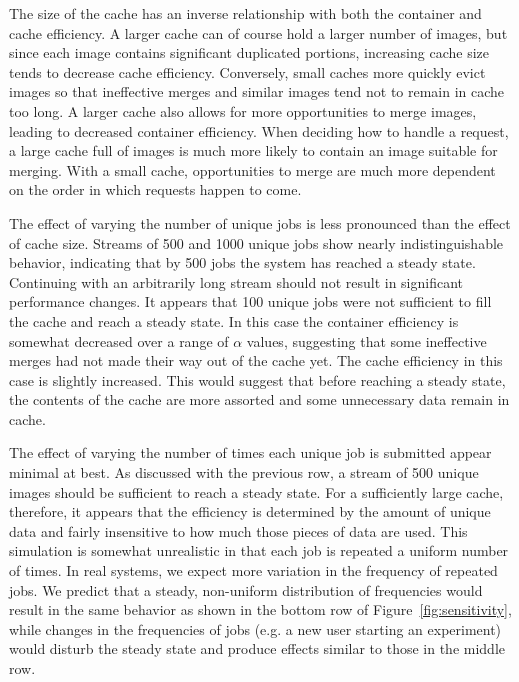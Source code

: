 \documentclass[sigconf]{acmart}
\begin{document}
The size of the cache has an inverse relationship with both the container and cache efficiency.
A larger cache can of course hold a larger number of images,
but since each image contains significant duplicated portions,
increasing cache size tends to decrease cache efficiency.
Conversely, small caches more quickly evict images so that ineffective merges and similar images tend not to remain in cache too long.
A larger cache also allows for more opportunities to merge images,
leading to decreased container efficiency.
When deciding how to handle a request,
a large cache full of images is much more likely to contain an image suitable for merging.
With a small cache, opportunities to merge are much more dependent on the order in which requests happen to come.

The effect of varying the number of unique jobs is less pronounced than the effect of cache size.
Streams of 500 and 1000 unique jobs show nearly indistinguishable behavior,
indicating that by 500 jobs the system has reached a steady state.
Continuing with an arbitrarily long stream should not result in significant performance changes.
It appears that 100 unique jobs were not sufficient to fill the cache and reach a steady state.
In this case the container efficiency is somewhat decreased over a range of $\alpha$ values,
suggesting that some ineffective merges had not made their way out of the cache yet.
The cache efficiency in this case is slightly increased.
This would suggest that before reaching a steady state,
the contents of the cache are more assorted and some unnecessary data remain in cache.

The effect of varying the number of times each unique job is submitted appear minimal at best.
As discussed with the previous row,
a stream of 500 unique images should be sufficient to reach a steady state.
For a sufficiently large cache, therefore,
it appears that the efficiency is determined by the amount of unique data and fairly insensitive to how much those pieces of data are used.
This simulation is somewhat unrealistic in that each job is repeated a uniform number of times.
In real systems, we expect more variation in the frequency of repeated jobs.
We predict that a steady, non-uniform distribution of frequencies would result in the same behavior as shown in the bottom row of Figure~\ref{fig:sensitivity},
while changes in the frequencies of jobs (e.g. a new user starting an experiment)
would disturb the steady state and produce effects similar to those in the middle row.
\end{document}
